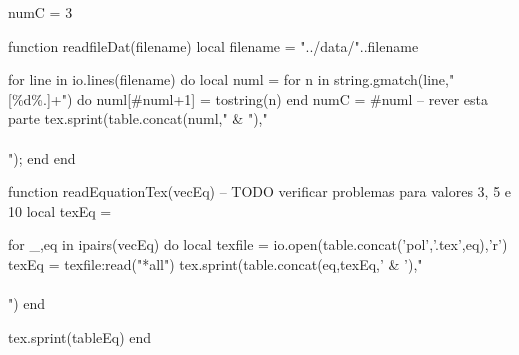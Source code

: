 

\begin{luacode}
  numC = 3

  function readfileDat(filename)
    local filename = "../data/"..filename

    for line in io.lines(filename) do
        local numl = {}
        for n in string.gmatch(line,"[\%d\%.]+") do
          numl[#numl+1] = tostring(n)
        end
        numC = #numl -- rever esta parte
        tex.sprint(table.concat(numl," & ")," \\\\");
    end
  end
\end{luacode}

\newcommand{\luaTable}[4][\directlua{tex.print(numC)}]
{
  \begin{table}[H]
  \centering
  \caption{#3}
  \begin{tabular}{*{#1}{c}}
  \hline
  #4\\
  \hline
  \directlua{readfileDat('#2')}
  \hline
  \end{tabular}
  \end{table}
}



\begin{luacode}
  function readEquationTex(vecEq)
    -- TODO verificar problemas para valores 3, 5 e 10
    local texEq = {}

    for _,eq in ipairs(vecEq) do
      local texfile = io.open(table.concat({'pol','.tex'},eq),'r')
      texEq = texfile:read("*all")
      tex.sprint(table.concat({eq,texEq},' & ')," \\\\")
    end

    tex.sprint(tableEq)
  end
\end{luacode}

\newcommand{\polyTable}[3][tbPoly]
{
  \begin{table}[H]
    \label{#1}
    \centering
    \caption{#3}
    \begin{tabular}{l p{10cm}}
      \hline
      $i$ & $f_i(x)$\\
      \hline
      \directlua{readEquationTex({#2})}
      \hline
    \end{tabular}
  \end{table}
}



\setcounter{cGraph}{1}
\newcommand{\plotedFigure}[2][\value{cGraph}]{
  \begin{figure}[H]
    \centering
    \texttt{[image: ../image/graph\#1.png]}
    \caption{#2}
  \end{figure}
  \stepcounter{cGraph}
}